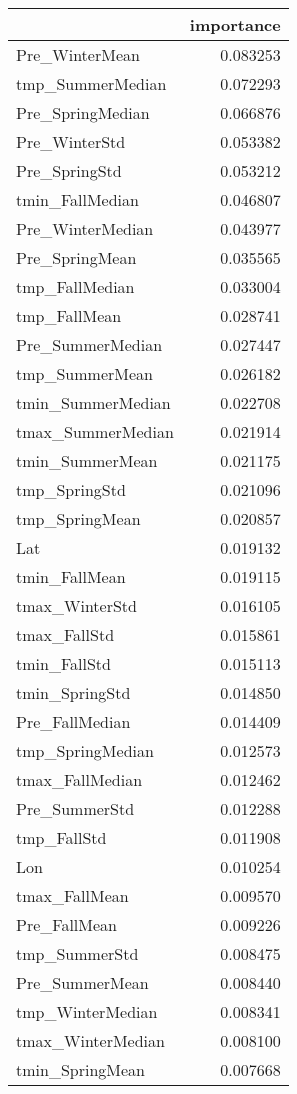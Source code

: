 \begin{tabular}{lr}
\toprule
 & importance \\
\midrule
Pre_WinterMean & 0.083253 \\
tmp_SummerMedian & 0.072293 \\
Pre_SpringMedian & 0.066876 \\
Pre_WinterStd & 0.053382 \\
Pre_SpringStd & 0.053212 \\
tmin_FallMedian & 0.046807 \\
Pre_WinterMedian & 0.043977 \\
Pre_SpringMean & 0.035565 \\
tmp_FallMedian & 0.033004 \\
tmp_FallMean & 0.028741 \\
Pre_SummerMedian & 0.027447 \\
tmp_SummerMean & 0.026182 \\
tmin_SummerMedian & 0.022708 \\
tmax_SummerMedian & 0.021914 \\
tmin_SummerMean & 0.021175 \\
tmp_SpringStd & 0.021096 \\
tmp_SpringMean & 0.020857 \\
Lat & 0.019132 \\
tmin_FallMean & 0.019115 \\
tmax_WinterStd & 0.016105 \\
tmax_FallStd & 0.015861 \\
tmin_FallStd & 0.015113 \\
tmin_SpringStd & 0.014850 \\
Pre_FallMedian & 0.014409 \\
tmp_SpringMedian & 0.012573 \\
tmax_FallMedian & 0.012462 \\
Pre_SummerStd & 0.012288 \\
tmp_FallStd & 0.011908 \\
Lon & 0.010254 \\
tmax_FallMean & 0.009570 \\
Pre_FallMean & 0.009226 \\
tmp_SummerStd & 0.008475 \\
Pre_SummerMean & 0.008440 \\
tmp_WinterMedian & 0.008341 \\
tmax_WinterMedian & 0.008100 \\
tmin_SpringMean & 0.007668 \\

\end{tabular}
